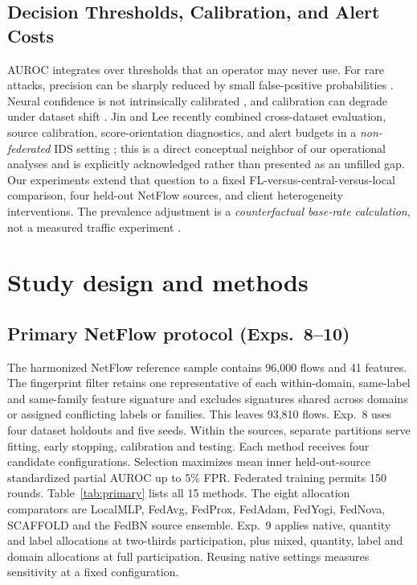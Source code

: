 \documentclass[journal,10pt]{IEEEtran}
\begin{document}
\subsection{Decision Thresholds, Calibration, and Alert Costs}
AUROC integrates over thresholds that an operator may never use. For rare attacks, precision can be sharply reduced by small false-positive probabilities \cite{saito2015}. Neural confidence is not intrinsically calibrated \cite{guo2017}, and calibration can degrade under dataset shift \cite{ovadia2019}. Jin and Lee recently combined cross-dataset evaluation, source calibration, score-orientation diagnostics, and alert budgets in a \emph{non-federated} IDS setting \cite{jin2026}; this is a direct conceptual neighbor of our operational analyses and is explicitly acknowledged rather than presented as an unfilled gap. Our experiments extend that question to a fixed FL-versus-central-versus-local comparison, four held-out NetFlow sources, and client heterogeneity interventions. The prevalence adjustment is a \emph{counterfactual base-rate calculation}, not a measured traffic experiment \cite{lipton2018}.

\section{Study design and methods}
\subsection{Primary NetFlow protocol (Exps.~8--10)}
The harmonized NetFlow reference sample contains 96,000 flows and 41 features. The fingerprint filter retains one representative of each within-domain, same-label and same-family feature signature and excludes signatures shared across domains or assigned conflicting labels or families. This leaves 93,810 flows. Exp.~8 uses four dataset holdouts and five seeds. Within the sources, separate partitions serve fitting, early stopping, calibration and testing. Each method receives four candidate configurations. Selection maximizes mean inner held-out-source standardized partial AUROC up to 5\% FPR. Federated training permits 150 rounds. Table~\ref{tab:primary} lists all 15 methods. The eight allocation comparators are LocalMLP, FedAvg, FedProx, FedAdam, FedYogi, FedNova, SCAFFOLD and the FedBN source ensemble. Exp.~9 applies native, quantity and label allocations at two-thirds participation, plus mixed, quantity, label and domain allocations at full participation. Reusing native settings measures sensitivity at a fixed configuration.
\end{document}
